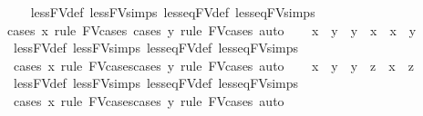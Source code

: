 \begin{isabellebody}
\ \ \isamarkupfalse%
\ less{\isacharunderscore}{\kern0pt}FV{\isacharunderscore}{\kern0pt}def\ less{\isacharunderscore}{\kern0pt}FV{\isachardot}{\kern0pt}simps\ less{\isacharunderscore}{\kern0pt}eq{\isacharunderscore}{\kern0pt}FV{\isacharunderscore}{\kern0pt}def\ less{\isacharunderscore}{\kern0pt}eq{\isacharunderscore}{\kern0pt}FV{\isachardot}{\kern0pt}simps\ \isanewline
\ \ \isamarkupfalse%
{\isacharparenleft}{\kern0pt}cases\ x\ rule{\isacharcolon}{\kern0pt}\ FV{\isacharunderscore}{\kern0pt}cases{\isacharparenright}{\kern0pt}\ {\isacharparenleft}{\kern0pt}cases\ y\ rule{\isacharcolon}{\kern0pt}\ FV{\isacharunderscore}{\kern0pt}cases{\isacharcomma}{\kern0pt}\ auto{\isacharparenright}{\kern0pt}\isanewline
\ \ \isamarkupfalse%
\ {\isachardoublequoteopen}x\ {\isasymle}\ y\ {\isasymLongrightarrow}\ y\ {\isasymle}\ x\ {\isasymLongrightarrow}\ x\ {\isacharequal}{\kern0pt}\ y{\isachardoublequoteclose}\isanewline
\ \ \isamarkupfalse%
\ less{\isacharunderscore}{\kern0pt}FV{\isacharunderscore}{\kern0pt}def\ less{\isacharunderscore}{\kern0pt}FV{\isachardot}{\kern0pt}simps\ less{\isacharunderscore}{\kern0pt}eq{\isacharunderscore}{\kern0pt}FV{\isacharunderscore}{\kern0pt}def\ less{\isacharunderscore}{\kern0pt}eq{\isacharunderscore}{\kern0pt}FV{\isachardot}{\kern0pt}simps\ \isanewline
\ \ \isamarkupfalse%
\ {\isacharparenleft}{\kern0pt}cases\ x\ rule{\isacharcolon}{\kern0pt}\ FV{\isacharunderscore}{\kern0pt}cases{\isacharparenright}{\kern0pt}{\isacharparenleft}{\kern0pt}cases\ y\ rule{\isacharcolon}{\kern0pt}\ FV{\isacharunderscore}{\kern0pt}cases{\isacharcomma}{\kern0pt}\ auto{\isacharparenright}{\kern0pt}{\isacharplus}{\kern0pt}\isanewline
\ \ \isamarkupfalse%
\ {\isachardoublequoteopen}x\ {\isasymle}\ y\ {\isasymLongrightarrow}\ y\ {\isasymle}\ z\ {\isasymLongrightarrow}\ x\ {\isasymle}\ z{\isachardoublequoteclose}\isanewline
\ \ \isamarkupfalse%
\ less{\isacharunderscore}{\kern0pt}FV{\isacharunderscore}{\kern0pt}def\ less{\isacharunderscore}{\kern0pt}FV{\isachardot}{\kern0pt}simps\ less{\isacharunderscore}{\kern0pt}eq{\isacharunderscore}{\kern0pt}FV{\isacharunderscore}{\kern0pt}def\ less{\isacharunderscore}{\kern0pt}eq{\isacharunderscore}{\kern0pt}FV{\isachardot}{\kern0pt}simps\ \isanewline
\ \ \isamarkupfalse%
\ {\isacharparenleft}{\kern0pt}cases\ x\ rule{\isacharcolon}{\kern0pt}\ FV{\isacharunderscore}{\kern0pt}cases{\isacharparenright}{\kern0pt}{\isacharparenleft}{\kern0pt}cases\ y\ rule{\isacharcolon}{\kern0pt}\ FV{\isacharunderscore}{\kern0pt}cases{\isacharcomma}{\kern0pt}\ auto{\isacharparenright}{\kern0pt}{\isacharplus}{\kern0pt}\isanewline

\end{isabellebody}
